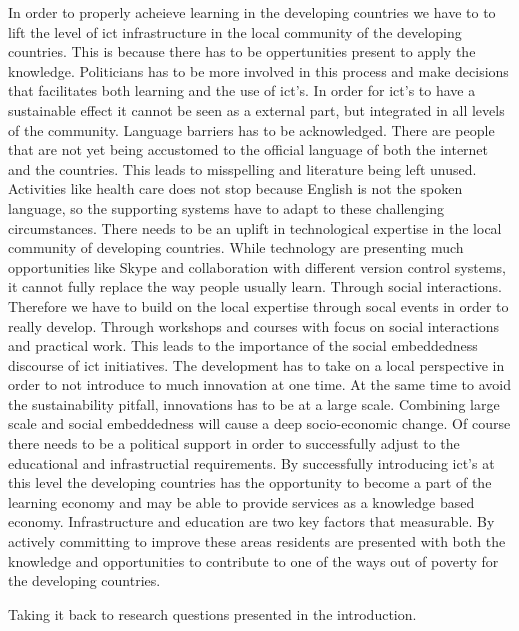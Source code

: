 In order to properly acheieve learning in the developing countries we have to to lift the level of \gls{ict} infrastructure in the local community of the developing countries.
This is because there has to be oppertunities present to apply the knowledge.
Politicians has to be more involved in this process and make decisions that facilitates both learning and the use of \gls{ict}'s.
In order for \gls{ict}'s to have a sustainable effect it cannot be seen as a external part, but integrated in all levels of the community.
Language barriers has to be acknowledged. 
There are people that are not yet being accustomed to the official language of both the internet and the countries.
This leads to misspelling and literature being left unused. 
Activities like health care does not stop because English is not the spoken language, so the supporting systems have to adapt to these challenging circumstances.
There needs to be an uplift in technological expertise in the local community of developing countries. 
While technology are presenting much opportunities like Skype and collaboration with different version control systems, it cannot fully replace the way people usually learn. Through social interactions. 
Therefore we have to build on the local expertise through socal events in order to really develop. 
Through workshops and courses with focus on social interactions and practical work. 
This leads to the importance of the social embeddedness discourse of \gls{ict} initiatives.
The development has to take on a local perspective in order to not introduce to much innovation at one time. 
At the same time to avoid the sustainability pitfall, innovations has to be at a large scale.
Combining large scale and social embeddedness will cause  a deep socio-economic change.
Of course there needs to be a political support in order to successfully adjust to the educational and infrastructial requirements.
By successfully introducing \gls{ict}'s at this level the developing countries has the opportunity to become a part of the learning economy and may be able to provide services as a knowledge based economy. 
Infrastructure and education are two key factors that measurable.
By actively committing to improve these areas residents are presented with both the knowledge and opportunities to contribute to one of the ways out of poverty for the developing countries. 

Taking it back to research questions presented in the introduction.


